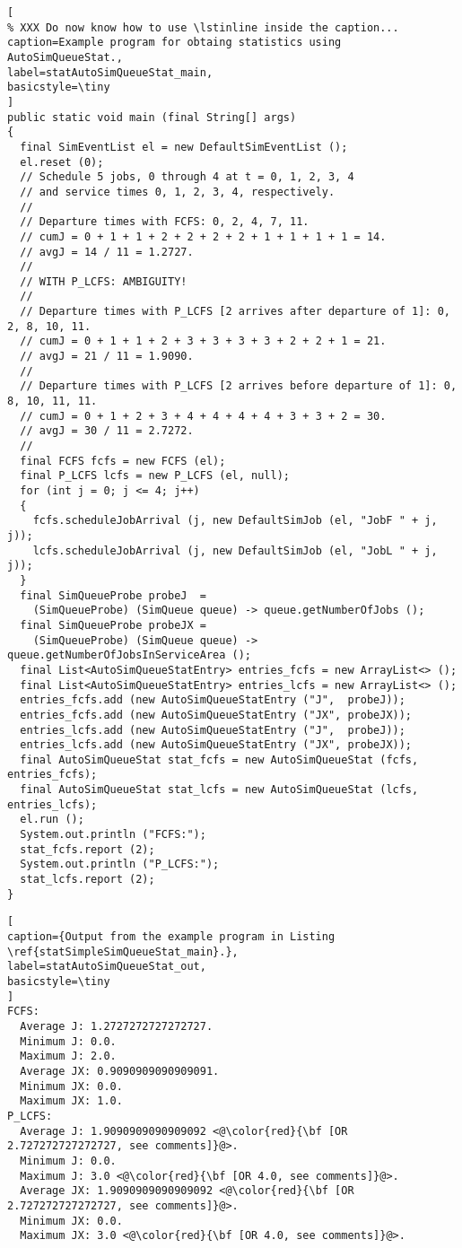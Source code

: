 \documentclass[12pt]{book}
\begin{document}
\begin{lstlisting}[
% XXX Do now know how to use \lstinline inside the caption...
caption=Example program for obtaing statistics using AutoSimQueueStat.,
label=statAutoSimQueueStat_main,
basicstyle=\tiny
]
public static void main (final String[] args)
{
  final SimEventList el = new DefaultSimEventList ();
  el.reset (0);
  // Schedule 5 jobs, 0 through 4 at t = 0, 1, 2, 3, 4
  // and service times 0, 1, 2, 3, 4, respectively.
  //
  // Departure times with FCFS: 0, 2, 4, 7, 11.
  // cumJ = 0 + 1 + 1 + 2 + 2 + 2 + 2 + 1 + 1 + 1 + 1 = 14.
  // avgJ = 14 / 11 = 1.2727.
  //
  // WITH P_LCFS: AMBIGUITY!
  //
  // Departure times with P_LCFS [2 arrives after departure of 1]: 0, 2, 8, 10, 11.
  // cumJ = 0 + 1 + 1 + 2 + 3 + 3 + 3 + 3 + 2 + 2 + 1 = 21.
  // avgJ = 21 / 11 = 1.9090.
  //
  // Departure times with P_LCFS [2 arrives before departure of 1]: 0, 8, 10, 11, 11.
  // cumJ = 0 + 1 + 2 + 3 + 4 + 4 + 4 + 4 + 3 + 3 + 2 = 30.
  // avgJ = 30 / 11 = 2.7272.    
  //
  final FCFS fcfs = new FCFS (el);
  final P_LCFS lcfs = new P_LCFS (el, null);
  for (int j = 0; j <= 4; j++)
  {
    fcfs.scheduleJobArrival (j, new DefaultSimJob (el, "JobF " + j, j));
    lcfs.scheduleJobArrival (j, new DefaultSimJob (el, "JobL " + j, j));
  }
  final SimQueueProbe probeJ  =
    (SimQueueProbe) (SimQueue queue) -> queue.getNumberOfJobs ();
  final SimQueueProbe probeJX =
    (SimQueueProbe) (SimQueue queue) -> queue.getNumberOfJobsInServiceArea ();
  final List<AutoSimQueueStatEntry> entries_fcfs = new ArrayList<> ();
  final List<AutoSimQueueStatEntry> entries_lcfs = new ArrayList<> ();
  entries_fcfs.add (new AutoSimQueueStatEntry ("J",  probeJ));
  entries_fcfs.add (new AutoSimQueueStatEntry ("JX", probeJX));
  entries_lcfs.add (new AutoSimQueueStatEntry ("J",  probeJ));
  entries_lcfs.add (new AutoSimQueueStatEntry ("JX", probeJX));
  final AutoSimQueueStat stat_fcfs = new AutoSimQueueStat (fcfs, entries_fcfs);
  final AutoSimQueueStat stat_lcfs = new AutoSimQueueStat (lcfs, entries_lcfs);
  el.run ();
  System.out.println ("FCFS:");
  stat_fcfs.report (2);
  System.out.println ("P_LCFS:");
  stat_lcfs.report (2);
}
\end{lstlisting}

\begin{lstlisting}[
caption={Output from the example program in Listing \ref{statSimpleSimQueueStat_main}.},
label=statAutoSimQueueStat_out,
basicstyle=\tiny
]
FCFS:
  Average J: 1.2727272727272727.
  Minimum J: 0.0.
  Maximum J: 2.0.
  Average JX: 0.9090909090909091.
  Minimum JX: 0.0.
  Maximum JX: 1.0.
P_LCFS:
  Average J: 1.9090909090909092 <@\color{red}{\bf [OR 2.727272727272727, see comments]}@>.
  Minimum J: 0.0.
  Maximum J: 3.0 <@\color{red}{\bf [OR 4.0, see comments]}@>.
  Average JX: 1.9090909090909092 <@\color{red}{\bf [OR 2.727272727272727, see comments]}@>.
  Minimum JX: 0.0.
  Maximum JX: 3.0 <@\color{red}{\bf [OR 4.0, see comments]}@>.
\end{lstlisting}
\end{document}
